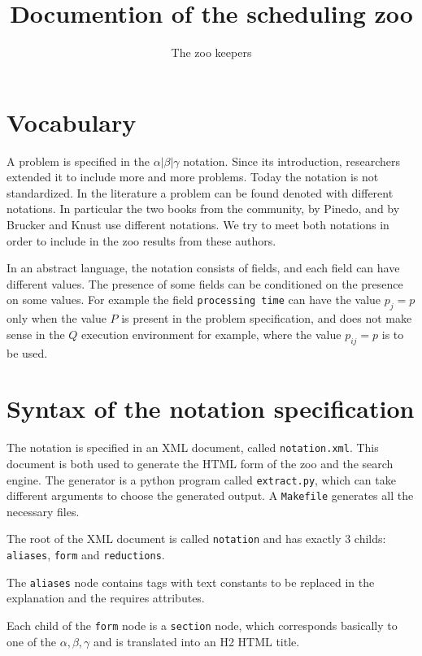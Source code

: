 \documentclass{article}
\begin{document}
\title{Documention of the scheduling zoo}
\author{The zoo keepers}
\maketitle

\section{Vocabulary}

A problem is specified in the $\alpha|\beta|\gamma$ notation.  Since its introduction, researchers extended it to include more and more problems.  Today the notation is not standardized.  In the literature a problem can be found denoted with different notations.  In particular the two books from the community, by Pinedo, and by Brucker and Knust use different notations. We try to meet both notations in order to include in the zoo results from these authors.

In an abstract language, the notation consists of fields, and each field can have different values.  The presence of some fields can be conditioned on the presence on some values. For example the field \texttt{processing time} can have the value $p_j=p$ only when the value $P$ is present in the problem specification, and does not make sense in the $Q$ execution environment for example, where the value $p_{ij}=p$ is to be used.

\section{Syntax of the notation specification}

The notation is specified in an XML document, called \texttt{notation.xml}.  This document is both used to generate the HTML form of the zoo and the search engine.  The generator is a python program called \texttt{extract.py}, which can take different arguments to choose the generated output.  A \texttt{Makefile} generates all the necessary files.

The root of the XML document is called \texttt{notation} and has exactly 3 childs: \texttt{aliases}, \texttt{form} and \texttt{reductions}.

The \texttt{aliases} node contains tags with text constants to be replaced in the explanation and the requires attributes.

Each child of the \texttt{form} node is a \texttt{section} node, which corresponds basically to one of the $\alpha, \beta,\gamma$ and is translated into an H2 HTML title.
\end{document}
